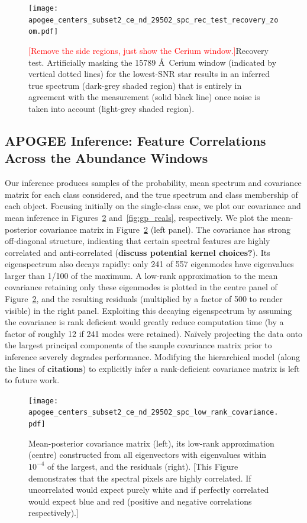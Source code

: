\documentclass[a4paper,fleqn,usenatbib]{mnras}
\begin{document}
\begin{figure}
	\texttt{[image: apogee\_centers\_subset2\_ce\_nd\_29502\_spc\_rec\_test\_recovery\_zoom.pdf]}
    \caption{\textcolor{red}{[Remove the side regions, just show the Cerium window.]}Recovery test. Artificially masking the 15789 \AA\ Cerium window (indicated by vertical dotted lines) for the lowest-SNR star results in an inferred true spectrum (dark-grey shaded region) that is entirely in agreement with the measurement (solid black line) once noise is taken into account (light-grey shaded region).}
    \label{fig:recovery_test}
\end{figure}

\subsection{APOGEE Inference: Feature Correlations Across the Abundance Windows}


Our inference produces samples of the probability, mean spectrum and covariance matrix for each class considered, and the true spectrum and class membership of each object. Focusing initially on the single-class case, we plot our covariance and mean inference in Figures~\ref{fig:inferred_cov} and~\ref{fig:gp_reals}, respectively. We plot the mean-posterior covariance matrix in Figure~\ref{fig:inferred_cov} (left panel). The covariance has strong off-diagonal structure, indicating that certain spectral features are highly correlated and anti-correlated ({\bf discuss potential kernel choices?}). Its eigenspectrum also decays rapidly: only 241 of 557 eigenmodes have eigenvalues larger than 1/100 of the maximum. A low-rank approximation to the mean covariance retaining only these eigenmodes is plotted in the centre panel of Figure~\ref{fig:inferred_cov}, and the resulting residuals (multiplied by a factor of 500 to render visible) in the right panel. Exploiting this decaying eigenspectrum by assuming the covariance is rank deficient would greatly reduce computation time (by a factor of roughly 12 if 241 modes were retained). Na\"ively projecting the data onto the largest principal components of the sample covariance matrix prior to inference severely degrades performance. Modifying the hierarchical model (along the lines of {\bf citations}) to explicitly infer a rank-deficient covariance matrix is left to future work.

\begin{figure}
	\texttt{[image: apogee\_centers\_subset2\_ce\_nd\_29502\_spc\_low\_rank\_covariance.pdf]}
    \caption{Mean-posterior covariance matrix (left), its low-rank approximation (centre) constructed from all eigenvectors with eigenvalues within $10^{-4}$ of the largest, and the residuals (right). [This Figure demonstrates that the spectral pixels are highly correlated. If uncorrelated would expect purely white and if perfectly correlated would expect blue and red (positive and negative correlations respectively).]}
    \label{fig:inferred_cov}
\end{figure}
\end{document}
